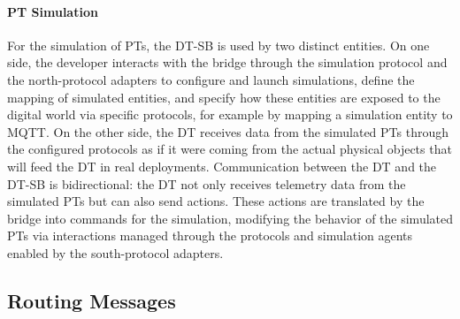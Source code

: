 \paragraph{PT Simulation}

For the simulation of PTs, the DT-SB is used by two distinct entities. On one side, the developer interacts with the bridge through the simulation protocol and the north-protocol adapters to configure and launch simulations, define the mapping of simulated entities, and specify how these entities are exposed to the digital world via specific protocols, for example by mapping a simulation entity to MQTT. On the other side, the DT receives data from the simulated PTs through the configured protocols as if it were coming from the actual physical objects that will feed the DT in real deployments. Communication between the DT and the DT-SB is bidirectional: the DT not only receives telemetry data from the simulated PTs but can also send actions. These actions are translated by the bridge into commands for the simulation, modifying the behavior of the simulated PTs via interactions managed through the protocols and simulation agents enabled by the south-protocol adapters.

\subsection{Routing Messages}


